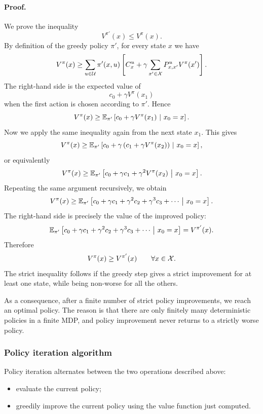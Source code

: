 \paragraph{Proof.}
We prove the inequality
\[
V^{\pi'}(x)\le V^\pi(x).
\]
By definition of the greedy policy \(\pi'\), for every state \(x\) we have
\[
V^\pi(x)
\ge
\sum_{u\in\mathcal{U}}\pi'(x,u)
\left[
C_x^u
+
\gamma\sum_{x'\in\mathcal{X}}P^u_{x,x'}V^\pi(x')
\right].
\]
The right-hand side is the expected value of
\[
c_0+\gamma V^\pi(x_1)
\]
when the first action is chosen according to \(\pi'\). Hence
\[
V^\pi(x)
\ge
\mathbb{E}_{\pi'}\left[
c_0+\gamma V^\pi(x_1)
\ \middle|\ x_0=x
\right].
\]
Now we apply the same inequality again from the next state \(x_1\). This gives
\[
V^\pi(x)
\ge
\mathbb{E}_{\pi'}\left[
c_0+\gamma\left(c_1+\gamma V^\pi(x_2)\right)
\ \middle|\ x_0=x
\right],
\]
or equivalently
\[
V^\pi(x)
\ge
\mathbb{E}_{\pi'}\left[
c_0+\gamma c_1+\gamma^2V^\pi(x_2)
\ \middle|\ x_0=x
\right].
\]
Repeating the same argument recursively, we obtain
\[
V^\pi(x)
\ge
\mathbb{E}_{\pi'}\left[
c_0+\gamma c_1+\gamma^2c_2+\gamma^3c_3+\cdots
\ \middle|\ x_0=x
\right].
\]
The right-hand side is precisely the value of the improved policy:
\[
\mathbb{E}_{\pi'}\left[
c_0+\gamma c_1+\gamma^2c_2+\gamma^3c_3+\cdots
\ \middle|\ x_0=x
\right]
=
V^{\pi'}(x).
\]
Therefore
\[
V^\pi(x)\ge V^{\pi'}(x)
\qquad
\forall x\in\mathcal{X}.
\]
The strict inequality follows if the greedy step gives a strict improvement for at least one
state, while being non-worse for all the others.

As a consequence, after a finite number of strict policy improvements, we reach an optimal
policy. The reason is that there are only finitely many deterministic policies in a finite MDP,
and policy improvement never returns to a strictly worse policy.

\subsubsection{Policy iteration algorithm}

Policy iteration alternates between the two operations described above:
\begin{itemize}
    \item evaluate the current policy;
    \item greedily improve the current policy using the value function just computed.
\end{itemize}

